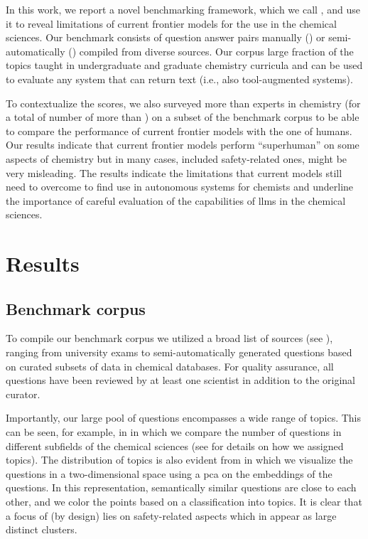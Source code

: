 \documentclass[11pt, oneside]{article}
\begin{document}
\begin{refsection}
In this work, we report a novel benchmarking framework, which we call \chembench, and use it to reveal limitations of current frontier models for the use in the chemical sciences.
Our benchmark consists of \xspace question answer pairs manually (\unskip) or semi-automatically (\unskip) compiled from diverse sources.
Our corpus large fraction of the topics taught in undergraduate and graduate chemistry curricula and can be used to evaluate any system that can return text (i.e., also tool-augmented systems).

To contextualize the scores, we also surveyed more than  experts in chemistry (for a total of number of more than \unskip) on a subset of the benchmark corpus to be able to compare the performance of current frontier models with the one of humans.
Our results indicate that current frontier models perform \enquote{superhuman} on some aspects of chemistry but in many cases, included safety-related ones, might be very misleading.
The results indicate the limitations that current models still need to overcome to find use in autonomous systems for chemists and underline the importance of careful evaluation of the capabilities of \glspl{llm} in the chemical sciences.

\section{Results}

\subsection{Benchmark corpus}

To compile our benchmark corpus we utilized a broad list of sources (see ), ranging from university exams to semi-automatically generated questions based on curated subsets of data in chemical databases.
For quality assurance, all questions have been reviewed by at least one scientist in addition to the original curator. 

Importantly, our large pool of questions encompasses a wide range of topics.
This can be seen, for example, in  in which we compare the number of questions in different subfields of the chemical sciences (see  for details on how we assigned topics).
The distribution of topics is also evident from  in which we visualize the questions in a two-dimensional space using a \gls{pca} on the embeddings of the questions.
In this representation, semantically similar questions are close to each other, and we color the points based on a classification into  topics. 
It is clear that a focus of \chembench (by design) lies on safety-related aspects which in  appear as large distinct clusters.



\end{refsection}
\end{document}
